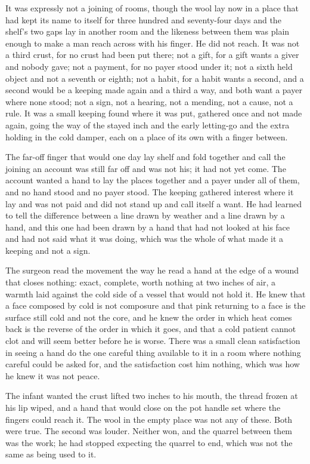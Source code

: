 It was expressly not a joining of rooms, though the wool lay now in a place that had kept its name to itself for three hundred and seventy-four days and the shelf's two gaps lay in another room and the likeness between them was plain enough to make a man reach across with his finger. He did not reach. It was not a third crust, for no crust had been put there; not a gift, for a gift wants a giver and nobody gave; not a payment, for no payer stood under it; not a sixth held object and not a seventh or eighth; not a habit, for a habit wants a second, and a second would be a keeping made again and a third a way, and both want a payer where none stood; not a sign, not a hearing, not a mending, not a cause, not a rule. It was a small keeping found where it was put, gathered once and not made again, going the way of the stayed inch and the early letting-go and the extra holding in the cold damper, each on a place of its own with a finger between.

The far-off finger that would one day lay shelf and fold together and call the joining an account was still far off and was not his; it had not yet come. The account wanted a hand to lay the places together and a payer under all of them, and no hand stood and no payer stood. The keeping gathered interest where it lay and was not paid and did not stand up and call itself a want. He had learned to tell the difference between a line drawn by weather and a line drawn by a hand, and this one had been drawn by a hand that had not looked at his face and had not said what it was doing, which was the whole of what made it a keeping and not a sign.

The surgeon read the movement the way he read a hand at the edge of a wound that closes nothing: exact, complete, worth nothing at two inches of air, a warmth laid against the cold side of a vessel that would not hold it. He knew that a face composed by cold is not composure and that pink returning to a face is the surface still cold and not the core, and he knew the order in which heat comes back is the reverse of the order in which it goes, and that a cold patient cannot clot and will seem better before he is worse. There was a small clean satisfaction in seeing a hand do the one careful thing available to it in a room where nothing careful could be asked for, and the satisfaction cost him nothing, which was how he knew it was not peace.

The infant wanted the crust lifted two inches to his mouth, the thread frozen at his lip wiped, and a hand that would close on the pot handle set where the fingers could reach it. The wool in the empty place was not any of these. Both were true. The second was louder. Neither won, and the quarrel between them was the work; he had stopped expecting the quarrel to end, which was not the same as being used to it.

